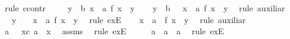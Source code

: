 \begin{isabellebody}
%
\isadelimproof
%
\endisadelimproof
%
\isatagproof
{}\isamarkupfalse%
\ {\isacharparenleft}rule\ ccontr{\isacharparenright}\isanewline
\ \ \isamarkupfalse%
\ {\isachardoublequoteopen}{\isasymnot}\ {\isacharparenleft}{\isasymforall}y\ {\isacharcolon}{\isacharcolon}\ {\isacharprime}b{\isachardot}\ {\isasymexists}x\ {\isacharcolon}{\isacharcolon}\ {\isacharprime}a{\isachardot}\ f\ x\ {\isacharequal}\ y{\isacharparenright}{\isachardoublequoteclose}\isanewline
\ \ \isamarkupfalse%
\ {\isachardoublequoteopen}{\isasymexists}y\ {\isacharcolon}{\isacharcolon}\ {\isacharprime}b\ {\isachardot}\ {\isasymnot}\ {\isacharparenleft}{\isasymexists}x\ {\isacharcolon}{\isacharcolon}\ {\isacharprime}a{\isachardot}\ f\ x\ {\isacharequal}\ y{\isacharparenright}{\isachardoublequoteclose}\ \isamarkupfalse%
\ {\isacharparenleft}rule\ auxiliar{\isacharunderscore}{}{\isacharparenright}\isanewline
\ \ \isamarkupfalse%
\ \isamarkupfalse%
\ y{}\ \ \ {\isachardoublequoteopen}{\isasymnot}\ {\isacharparenleft}{\isasymexists}x\ {\isacharcolon}{\isacharcolon}\ {\isacharprime}a{\isachardot}\ f\ x\ {\isacharequal}\ y{}{\isacharparenright}{\isachardoublequoteclose}\ \isamarkupfalse%
\ {\isacharparenleft}rule\ exE{\isacharparenright}\isanewline
\ \ \isamarkupfalse%
\ {\isachardoublequoteopen}{\isasymforall}x\ {\isacharcolon}{\isacharcolon}\ {\isacharprime}a{\isachardot}\ {\isacharparenleft}{\isasymnot}\ {\isacharparenleft}f\ x\ {\isacharequal}\ y{}{\isacharparenright}{\isacharparenright}{\isachardoublequoteclose}\ \isamarkupfalse%
\ {\isacharparenleft}rule\ auxiliar{\isacharunderscore}{}{\isacharparenright}\isanewline
\ \ \isamarkupfalse%
\ a{}\ \ {\isachardoublequoteopen}\ {\isasymexists}{\isacharparenleft}x{}{\isacharcolon}{\isacharcolon}{\isacharprime}c{\isacharparenright}{\isachardot}\ a{}\ {\isasymnoteq}\ x{}{\isachardoublequoteclose}\ \isamarkupfalse%
\ assms{\isacharparenleft}{}{\isacharparenright}\ \isamarkupfalse%
\ {\isacharparenleft}rule\ exE{\isacharparenright}\isanewline
\ \ \isamarkupfalse%
\ \isamarkupfalse%
\ a{}\ \ {\isachardoublequoteopen}a{}\ {\isasymnoteq}\ a{}{\isachardoublequoteclose}\ \isamarkupfalse%
\ {\isacharparenleft}rule\ exE{\isacharparenright}\isanewline

\end{isabellebody}

